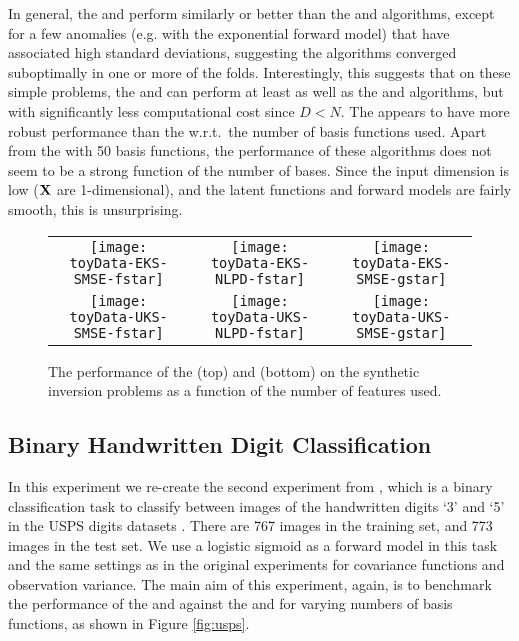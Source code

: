 In general, the \eks and \uks perform similarly or better than the \egp and
\ugp algorithms, except for a few anomalies (e.g. \egp with the exponential
forward model) that have associated high standard deviations, suggesting the
algorithms converged suboptimally in one or more of the folds. Interestingly,
this suggests that on these simple problems, the \eks and \uks can perform at
least as well as the \egp and \uks algorithms, but with significantly less
computational cost since $D < N$. The \eks appears to have more robust
performance than the \uks w.r.t.\ the number of basis functions used. Apart
from the \uks with 50 basis functions, the performance of these algorithms does
not seem to be a strong function of the number of bases. Since the input
dimension is low ($\mathbf{X}$ are 1-dimensional), and the latent functions and
forward models are fairly smooth, this is unsurprising.

\begin{figure*}
\centering
\begin{tabular}{c c c}
\texttt{[image: toyData-EKS-SMSE-fstar]} &
\texttt{[image: toyData-EKS-NLPD-fstar]} &
\texttt{[image: toyData-EKS-SMSE-gstar]} \\
\texttt{[image: toyData-UKS-SMSE-fstar]} &
\texttt{[image: toyData-UKS-NLPD-fstar]} &
\texttt{[image: toyData-UKS-SMSE-gstar]} \\
\end{tabular}
\caption{The performance of the \eks (top) and \uks (bottom)
on the synthetic inversion problems as a function of the number of features used. 
\label{fig:toyinversions}
}
\end{figure*}
%
\subsection{Binary Handwritten Digit Classification}
In this experiment we re-create the second experiment from
\citet{steinberg-bonilla-nips-2014}, which is a binary classification task to
classify between images of the handwritten digits `3' and `5' in the USPS
digits datasets \cite{rasmussen-williams-book}. There are 767 images in the
training set, and 773 images in the test set. We use a logistic sigmoid as a
forward model in this task and the same settings as in the original
    experiments for covariance functions and observation variance. The main
aim of this experiment, again, is to benchmark the performance of the \eks and
\uks against the \egp and \ugp for varying numbers of basis functions, as shown
in Figure \ref{fig:usps}. 

